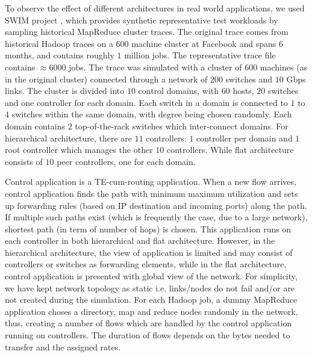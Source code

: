 \documentclass[10pt, twocolumn]{article}
\begin{document}
To observe the effect of different architectures in real world applications, we used SWIM project \cite{swim}, which provides synthetic representative test workloads  by sampling historical MapReduce cluster traces. The original trace comes from historical Hadoop traces on a 600 machine cluster at Facebook and spans $6$ months, and contains roughly $1$ million jobs. The representative trace file contains $\approx 6000$ jobs. The trace was simulated with a cluster of $600$ machines (as in the original cluster) connected through a network of $200$ switches and $10$ Gbps links. The cluster is divided into $10$ control domains, with $60$ hosts, $20$ switches and one controller for each domain. Each switch in a domain is connected to $1$ to $4$ switches within the same domain, with degree being chosen randomly. Each domain contains $2$ top-of-the-rack switches which inter-connect domains. For hierarchical architecture, there are $11$ controllers: $1$ controller per domain and $1$ root controller which manages the other $10$ controllers. While flat architecture consists of $10$ peer controllers, one for each domain.

Control application is a TE-cum-routing application. When a new flow arrives, control application finds the path with minimum maximum utilization and sets up forwarding rules (based on IP destination and incoming ports) along the path. If multiple such paths exist (which is frequently the case, due to a large network), shortest path (in term of number of hops) is chosen. This application runs on each controller in both hierarchical and flat architecture. However, in the hierarchical architecture, the view of application is limited and may consist of controllers or switches as forwarding elements, while in the flat architecture, control application is presented with global view of the network. For simplicity, we have kept network topology as static i.e. links/nodes do not fail and/or are not created during the simulation. For each Hadoop job, a dummy MapReduce application choses a directory, map and reduce nodes randomly in the network, thus, creating a number of flows which are handled by the control application running on controllers. The duration of flows depends on the bytes needed to transfer and the assigned rates.            
\end{document}

